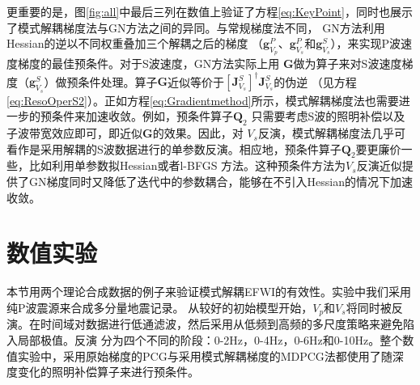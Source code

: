 更重要的是，图\ref{fig:all}中最后三列在数值上验证了方程\eqref{eq:KeyPoint}，同时也展示了模式解耦梯度法与GN方法之间的异同。与常规梯度法不同，
GN方法利用Hessian的逆以不同权重叠加三个解耦之后的梯度
（$\mathbf{g}^P_{V_p}$、$\mathbf{g}^P_{V_s}$和$\mathbf{g}^S_{V_s}$），来实现P波速度梯度的最佳预条件。对于S波速度，GN方法实际上用
$\mathbf{G}$做为算子来对S波速度梯度（$\mathbf{g}^S_{V_s}$）做预条件处理。算子$\mathbf{G}$近似等价于$[\mathbf{J}^{S}_{V_s}]^{\dagger}\mathbf{J}^{S}_{V_s}$的伪逆
（见方程\ref{eq:ResoOperS2}）。正如方程\eqref{eq:Gradientmethod}所示，模式解耦梯度法也需要进一步的预条件来加速收敛。例如，预条件算子$\mathbf{Q}_2$
只需要考虑S波的照明补偿以及子波带宽效应即可，即近似$\mathbf{G}$的效果。因此，对
$V_s$反演，模式解耦梯度法几乎可看作是采用解耦的S波数据进行的单参数反演。相应地，预条件算子$\mathbf{Q}_2$要更廉价一些，比如利用单参数拟Hessian或者l-BFGS
方法。这种预条件方法为$V_s$反演近似提供了GN梯度同时又降低了迭代中的参数耦合，能够在不引入Hessian的情况下加速收敛。

\section{数值实验}
本节用两个理论合成数据的例子来验证模式解耦EFWI的有效性。实验中我们采用纯P波震源来合成多分量地震记录。
从较好的初始模型开始，$V_p$和$V_s$将同时被反演。在时间域对数据进行低通滤波，然后采用从低频到高频的多尺度策略来避免陷入局部极值。反演
分为四个不同的阶段：0-2Hz，0-4Hz，0-6Hz和0-10Hz。整个数值实验中，采用原始梯度的PCG与采用模式解耦梯度的MDPCG法都使用了随深度变化的照明补偿算子来进行预条件\cite[]{kohn:2012}。
